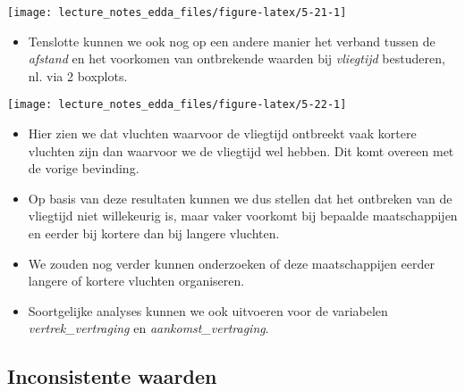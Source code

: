 \documentclass[]{memoir}
\providecommand{\tightlist}{%
  \setlength{\itemsep}{0pt}\setlength{\parskip}{0pt}}
\begin{document}
\texttt{[image: lecture\_notes\_edda\_files/figure-latex/5-21-1]}

\begin{itemize}
\tightlist
\item
  Tenslotte kunnen we ook nog op een andere manier het verband tussen de
  \emph{afstand} en het voorkomen van ontbrekende waarden bij
  \emph{vliegtijd} bestuderen, nl. via 2 boxplots.
\end{itemize}

\texttt{[image: lecture\_notes\_edda\_files/figure-latex/5-22-1]}

\begin{itemize}
\tightlist
\item
  Hier zien we dat vluchten waarvoor de vliegtijd ontbreekt vaak kortere
  vluchten zijn dan waarvoor we de vliegtijd wel hebben. Dit komt
  overeen met de vorige bevinding.
\item
  Op basis van deze resultaten kunnen we dus stellen dat het ontbreken
  van de vliegtijd niet willekeurig is, maar vaker voorkomt bij bepaalde
  maatschappijen en eerder bij kortere dan bij langere vluchten.
\item
  We zouden nog verder kunnen onderzoeken of deze maatschappijen eerder
  langere of kortere vluchten organiseren.
\item
  Soortgelijke analyses kunnen we ook uitvoeren voor de variabelen
  \emph{vertrek\_vertraging} en \emph{aankomst\_vertraging}.
\end{itemize}

\subsection{Inconsistente waarden}\label{inconsistente-waarden}
\end{document}
